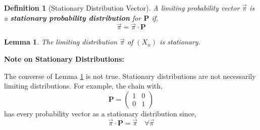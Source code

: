 \documentclass{tufte-handout}
\newtheorem{lem}[thm]{Lemma}
\newtheorem{defn}[thm]{Definition}
\begin{document}
  \begin{defn}[Stationary Distribution Vector]
    A limiting probability vector $\Vec{\pi}$ is a \textbf{stationary probability distribution} for $\boldsymbol{P}$ if,
    \[ \Vec{\pi} = \Vec{\pi} \cdot \boldsymbol{P} \]
  \end{defn}

  \begin{lem}
    The limiting distribution $\Vec{\pi}$ of $(X_n)$ is stationary.
    \label{limitdiststat}
  \end{lem}

  \begin{marginfigure}
    \textbf{Note on Stationary Distributions:}

    \noindent The converse of Lemma \ref{limitdiststat} is not true. Stationary distributions are not necessarily limiting distributions. For example, the chain with,
    \[\boldsymbol{P}=\left(\begin{array}{ll}1 & 0 \\ 0 & 1\end{array}\right)\]
    \noindent has every probability vector as a stationary distribution since,
    \[\Vec{\pi} \cdot \boldsymbol{P} = \Vec{\pi} \quad \forall \Vec{\pi}\]

  \end{marginfigure}
\end{document}
